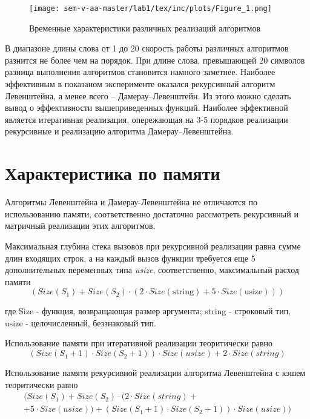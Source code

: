 \begin{figure}
    \centering
\texttt{[image: sem-v-aa-master/lab1/tex/inc/plots/Figure\_1.png]}

    \caption{Временные характеристики различных реализаций алгоритмов}
    \label{fig:timestamps}
\end{figure}

В диапазоне длины слова от 1 до 20 скорость работы различных алгоритмов разнится не более чем на порядок. При длине слова, превышающей 20 символов разница выполнения алгоритмов становится намного заметнее. Наиболее эффективным в показаном эксперименте оказался рекурсивный алгоритм Левенштейна, а менее всего -- Дамерау--Левенштейн. 
Из этого можно сделать вывод о эффективности вышеприведенных функций. Наиболее эффективной является итеративная реализация, опережающая на 3-5 порядков реализации рекурсивные и реализацию алгоритма Дамерау--Левенштейна. 

\section{Характеристика по памяти}

\par
	Алгоритмы Левенштейна и Дамерау-Левенштейна не отличаются по использованию памяти, соответственно достаточно рассмотреть рекурсивный и матричный реализации этих алгоритмов.
	\par
	Максимальная глубина стека вызовов при рекурсивной реализации равна сумме длин входящих строк, а на каждый вызов функции требуется еще 5 дополнительных переменных типа \textit{usize}, соответственно, максимальный расход памяти
	\begin{equation}
		(Size(S_{1}) + Size(S_{2}) \cdot (2 \cdot Size(\text{string}) + 5 \cdot Size(\text{usize})))
	\end{equation}
	
	\noindent
	где Size - функция, возвращающая размер аргумента; string - строковый тип, usize - целочисленный, беззнаковый тип.
	\par
	Использование памяти при итеративной реализации теоритически равно
	\begin{equation}
		\label{eq:mem_req}
		(Size(S_{1} + 1) \cdot Size(S_{2} + 1)) \cdot Size(usize) + 2 \cdot Size(string)
	\end{equation}
	\par
	Использование памяти рекурсивной реализации алгоритма Левенштейна с кэшем теоритически равно
	\begin{multline}
		\label{eq:mem_iter}
		(Size(S_{1}) + Size(S_{2}) \cdot (2 \cdot Size(string) +\\+ 5 \cdot Size(usize)) + (Size(S_{1} + 1) \cdot Size(S_{2} + 1)) \cdot Size(usize))
	\end{multline}

